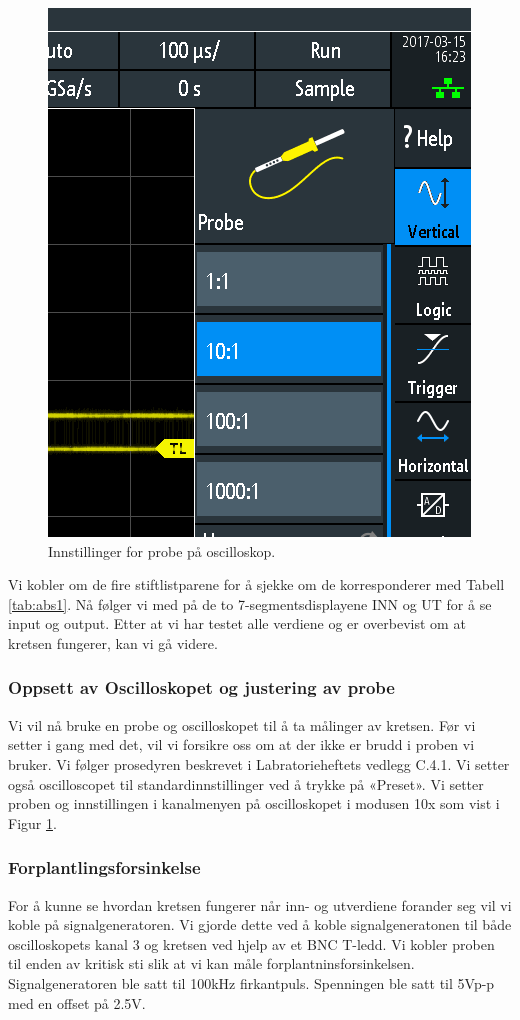 \documentclass{article}
\begin{document}
\begin{figure}
	\includegraphics[scale=0.25]{SCR03}
	\caption{Innstillinger for probe på oscilloskop.}
	\label{fig:inst1}
\end{figure}


Vi kobler om de fire stiftlistparene for å sjekke om de korresponderer med Tabell \ref{tab:abs1}. Nå følger vi med på de to 7-segmentsdisplayene INN og UT for å se input og output. Etter at vi har testet alle verdiene og er overbevist om at kretsen fungerer, kan vi gå videre.

\subsubsection{Oppsett av Oscilloskopet og justering av probe}
Vi vil nå bruke en probe og oscilloskopet til å ta målinger av kretsen. Før vi setter i gang med det, vil vi forsikre oss om at der ikke er brudd i proben vi bruker. Vi følger prosedyren beskrevet i Labratorieheftets vedlegg C.4.1. Vi setter også oscilloscopet til standardinnstillinger ved å trykke på «Preset». Vi setter proben og innstillingen i kanalmenyen på oscilloskopet i modusen 10x som vist i Figur \ref{fig:inst1}.

\subsubsection{Forplantlingsforsinkelse}
For å kunne se hvordan kretsen fungerer når inn- og utverdiene forander seg vil vi koble på signalgeneratoren. Vi gjorde dette ved å koble signalgeneratonen til både oscilloskopets kanal 3 og kretsen ved hjelp av et BNC T-ledd. Vi kobler proben til enden av kritisk sti slik at vi kan måle forplantninsforsinkelsen. Signalgeneratoren ble satt til 100kHz firkantpuls. Spenningen ble satt til 5Vp-p med en offset på 2.5V.
\end{document}
